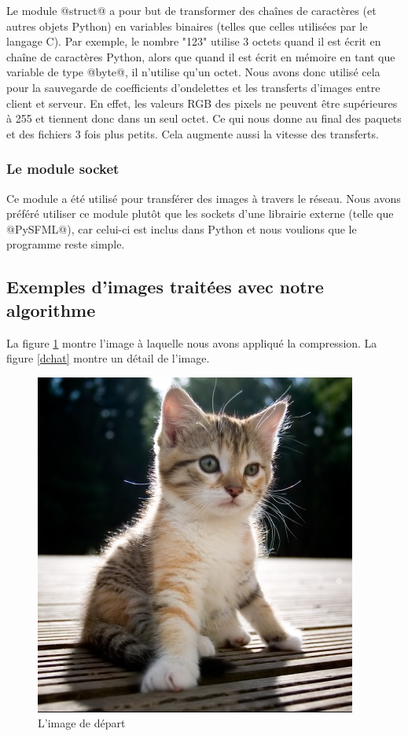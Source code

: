 \documentclass{article}
\begin{document}
Le module @struct@ a pour but de transformer des chaînes de caractères (et autres objets Python) en variables binaires (telles que celles utilisées par le langage C). Par exemple, le nombre "123" utilise 3 octets quand il est écrit en chaîne de caractères Python, alors que quand il est écrit en mémoire en tant que variable de type @byte@, il n'utilise qu'un octet. Nous avons donc utilisé cela pour la sauvegarde de coefficients d'ondelettes et les transferts d'images entre client et serveur. En effet, les valeurs RGB des pixels ne peuvent être supérieures à 255 et tiennent donc dans un seul octet. Ce qui nous donne au final des paquets et des fichiers 3 fois plus petits. Cela augmente aussi la vitesse des transferts.


\subsubsection{Le module socket}

Ce module a été utilisé pour transférer des images à travers le réseau. Nous avons préféré utiliser ce module plutôt que les sockets d'une librairie externe (telle que @PySFML@), car celui-ci est inclus dans Python et nous voulions que le programme reste simple.







\subsection{Exemples d'images traitées avec notre algorithme}


La figure \ref{chat1} montre l'image à laquelle nous avons appliqué la compression. La figure \ref{dchat} montre un détail de l'image.

\begin{figure}[!h]
\centering
\includegraphics[scale=0.8]{images/chat.jpg}
\caption{L'image de départ}
\label{chat1}
\end{figure}
\end{document}
